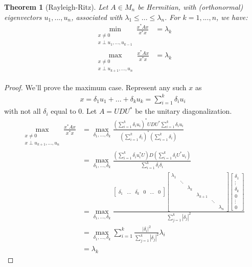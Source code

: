 \documentclass[11pt]{article}
\theoremstyle{plain}
\newtheorem{thm}{Theorem}[section]
\theoremstyle{definition}
\theoremstyle{remark}
\begin{document}
\begin{thm}[Rayleigh-Ritz]
    Let $A \in M_n$ be Hermitian, with (orthonormal) eigenvectors $u_1, ..., u_n$, associated with $\lambda_1 \leq ... \leq \lambda_n$. For $k = 1, ..., n$, we have:
    \begin{align*}
        \min_{\substack{x \neq 0 \\ x \perp u_1 ,..., u_{k-1}}} \frac{x^* A x}{x^* x} &= \lambda_k\\
        \max_{\substack{x \neq 0 \\ x \perp u_{k+1} ,..., u_n}} \frac{x^* A x}{x^* x} &= \lambda_k
    \end{align*}
\end{thm}
\begin{proof}
    We'll prove the maximum case. Represent any such $x$ as
    \begin{align*}
        x = \delta_{1} u_{1} + ... + \delta_k u_k = \sum_{i=1}^k \delta_i u_i
    \end{align*}
    with not all $\delta_i$ equal to 0. Let $A = UDU^*$ be the unitary diagonalization.
    \begin{align*}
        \max_{\substack{x \neq 0 \\ x \perp u_{k+1} ,..., u_n}} \frac{x^* A x}{x^* x} &= \max_{\delta_1, ..., \delta_k} \frac{(\sum_{i=1}^k \delta_i u_i)^* U D U^* \sum_{i=1}^k \delta_i u_i}{(\sum_{i=1}^k \delta_i)^* (\sum_{i=1}^k \delta_i)}\\
        &= \max_{\delta_1, ..., \delta_k} \frac{(\sum_{i=1}^k \overline{\delta_i} u_i^* U) D (\sum_{i=1}^k \delta_i U^* u_i)}{\sum_{i=1}^k \overline{\delta_i} \delta_i}\\
        &= \max_{\delta_1, ..., \delta_k} \frac{\begin{bmatrix}
            \overline{\delta_1} & \ldots & \overline{\delta_k} & 0 & \ldots & 0
        \end{bmatrix}
        \begin{bmatrix}
            \lambda_1 & & & & &\\
            & \ddots & & & &\\
            & & \lambda_k & & &\\
            & & & \lambda_{k+1} & &\\
            & & & & \ddots &\\
            & & & & & \lambda_n
        \end{bmatrix}
        \begin{bmatrix}
            \delta_1 \\ \vdots \\ \delta_k \\ 0 \\ \vdots \\ 0
        \end{bmatrix}}{\sum_{j=1}^k |\delta_j|^2}\\
        &= \max_{\delta_1, ..., \delta_k} \sum_{i=1}^k \frac{|\delta_i|^2}{\sum_{j=1}^k |\delta_j|^2} \lambda_i\\
        &= \lambda_k
    \end{align*}
\end{proof}
\end{document}
